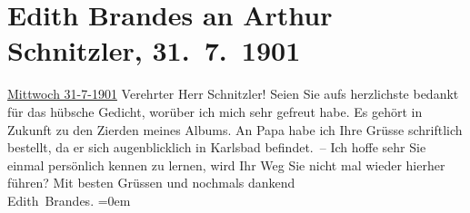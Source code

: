 

         
         \renewcommand{\erwaehntePersonen}{Personen: Georg Brandes, Edith Philipp}
         \renewcommand{\erwaehnteOrte}{Orte: Karlsbad, Vahrn, Wien}
         \renewcommand{\erwaehnteWerke}{}
               \section[Edith Brandes an Arthur Schnitzler, 31. 7. 1901]{ Edith Brandes an Arthur Schnitzler, 31. 7. 1901}\nopagebreak{}\rehead{ }\begin{ledgroupsized}[t]{13cm}\normalsize\beginnumbering{} \toendnotes[C]{\smallbreak\pagebreak[2]} 
\toendnotes[C]{\smallbreak}\pstart
           \raggedleft{}{\pb}\uline{Mittwoch 31-7-1901}\pend
           \pstart{}Verehrter Herr Schnitzler!\pend\pstart
           Seien Sie aufs herzlichste bedankt für das hübsche Gedicht, worüber ich mich sehr
               gefreut habe. Es gehört in Zukunft zu den Zierden meines Albums. An Papa habe ich Ihre Grüsse schriftlich
               bestellt, da er sich augenblicklich in Karlsbad
               befindet. –\pend
           \pstart
           {\pb}Ich hoffe sehr Sie einmal
               persönlich kennen zu lernen, wird Ihr Weg Sie nicht mal wieder hierher führen?\pend
           \pstart
           Mit besten Grüssen und nochmals dankend{\\[\baselineskip]}\spacefill\mbox{Edith Brandes.}\pend
           \leftskip=0em{}
         
         \endnumbering{}\end{ledgroupsized}  \newcommand{\dateiname}{L01155}\newcommand{\titel}{Edith Brandes an Arthur Schnitzler, 31. 7. 1901}\newcommand{\editorInnen}{Martin Anton Müller und Gerd-Hermann Susen}
      